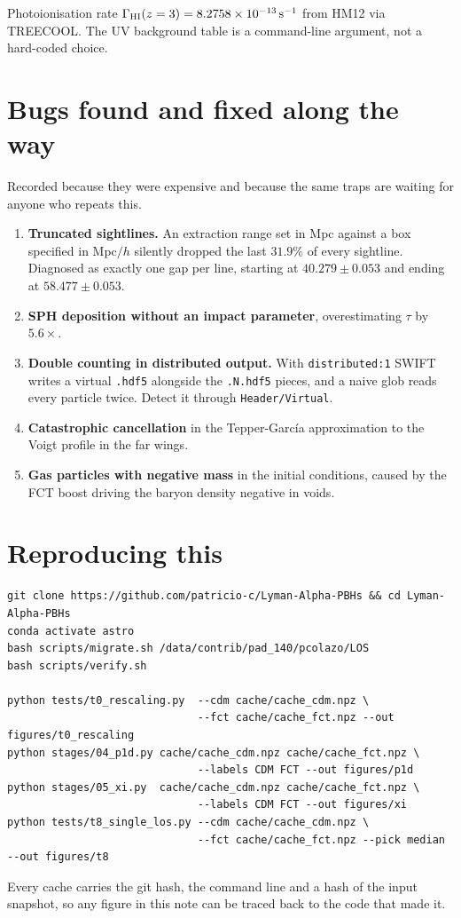 \documentclass[11pt,a4paper]{article}
\newcommand{\code}[1]{\texttt{\small #1}}
\begin{document}
Photoionisation rate $\Gamma_{\rm HI}(z=3) = 8.2758\times10^{-13}\,
{\rm s^{-1}}$ from HM12 via TREECOOL. The UV background table is a
command-line argument, not a hard-coded choice.

\section{Bugs found and fixed along the way}

Recorded because they were expensive and because the same traps are waiting
for anyone who repeats this.

\begin{enumerate}
\item \textbf{Truncated sightlines.} An extraction range set in Mpc against
a box specified in Mpc$/h$ silently dropped the last $31.9\%$ of every
sightline. Diagnosed as exactly one gap per line, starting at
$40.279 \pm 0.053$ and ending at $58.477 \pm 0.053$.
\item \textbf{SPH deposition without an impact parameter}, overestimating
$\tau$ by $5.6\times$.
\item \textbf{Double counting in distributed output.} With
\code{distributed:1} SWIFT writes a virtual \code{.hdf5} alongside the
\code{.N.hdf5} pieces, and a naive glob reads every particle twice. Detect
it through \code{Header/Virtual}.
\item \textbf{Catastrophic cancellation} in the Tepper-Garc\'ia
approximation to the Voigt profile in the far wings.
\item \textbf{Gas particles with negative mass} in the initial conditions,
caused by the FCT boost driving the baryon density negative in voids.
\end{enumerate}

\section{Reproducing this}

\begin{verbatim}
git clone https://github.com/patricio-c/Lyman-Alpha-PBHs && cd Lyman-Alpha-PBHs
conda activate astro
bash scripts/migrate.sh /data/contrib/pad_140/pcolazo/LOS
bash scripts/verify.sh

python tests/t0_rescaling.py  --cdm cache/cache_cdm.npz \
                              --fct cache/cache_fct.npz --out figures/t0_rescaling
python stages/04_p1d.py cache/cache_cdm.npz cache/cache_fct.npz \
                              --labels CDM FCT --out figures/p1d
python stages/05_xi.py  cache/cache_cdm.npz cache/cache_fct.npz \
                              --labels CDM FCT --out figures/xi
python tests/t8_single_los.py --cdm cache/cache_cdm.npz \
                              --fct cache/cache_fct.npz --pick median --out figures/t8
\end{verbatim}

Every cache carries the git hash, the command line and a hash of the input
snapshot, so any figure in this note can be traced back to the code that
made it.
\end{document}
